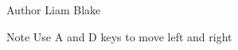 \begin{DoxyAuthor}{Author}
Liam Blake
\end{DoxyAuthor}
\begin{DoxyNote}{Note}
Use A and D keys to move left and right 
\end{DoxyNote}
